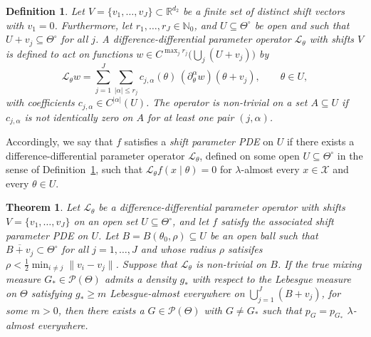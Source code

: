 \documentclass[11pt,twoside]{article} %
\newtheorem{theorem}{Theorem}
\newtheorem{definition}{Definition}
\begin{document}
\begin{definition}\label{def:shift_operator}
Let $V=\{v_1,\ldots,v_J\}\subset\mathbb R^{d_2}$ be a finite set of distinct shift vectors with $v_1=0$. Furthermore, let $r_1,\ldots,r_J\in\mathbb N_0$, and $U\subseteq\Theta^\circ$ be open and such that $U+v_j\subseteq\Theta^\circ$ for all $j$. A \emph{difference-differential parameter operator} $\mathcal L_\theta$ with shifts $V$ is defined to act on functions $ w\in C^{\max_{j}r_j}\big( \bigcup_j(U+v_j)\big)$ by
%
\begin{equation*}
    \mathcal L_\theta w=\sum_{j=1}^J\sum_{|\alpha|\le r_j}c_{j,\alpha}(\theta)\,(\partial^\alpha_\theta w)(\theta+v_j), \qquad \theta \in U,
\end{equation*}
%
with coefficients $c_{j,\alpha}\in C^{|\alpha|}(U)$. The operator is \emph{non-trivial} on a set $A\subseteq U$ if $c_{j,\alpha}$ is not identically zero on $A$ for at least one pair $(j,\alpha)$.
\end{definition}

Accordingly, we say that $f$ satisfies a \emph{shift parameter PDE} on $U$ if  there exists a difference-differential parameter operator $\mathcal L_\theta$, defined on some open $U\subseteq \Theta^\circ$ in the sense of Definition~\ref{def:shift_operator}, such that $\mathcal L_\theta f(x\mid\theta)=0$ for $\lambda$-almost every $x\in\mathcal X$ and every $\theta\in U$.

\begin{theorem}\label{thm:shift}
Let $\mathcal L_\theta$ be a difference-differential parameter operator with shifts $V=\{v_1,\ldots,v_J\}$ on an open set $U\subseteq\Theta^\circ$, and let $f$ satisfy the associated shift parameter PDE on $U$. Let $B=B(\theta_0,\rho)\subseteq U$ be an open ball such that $\overline{B+v_j}\subset\Theta^\circ$ for all $j =1 ,\ldots, J$ and whose radius $\rho$ satisifes $\rho< \frac{1}{2} \min_{i\ne j}\|v_i-v_j\|$.
%
%
Suppose that $\mathcal L_\theta$ is non-trivial on $B$. If the true mixing measure $G_*\in\mathcal P(\Theta)$ admits a density $g_*$ with respect to the Lebesgue measure on $\Theta$ satisfying $g_*\ge m$ Lebesgue-almost everywhere on $\bigcup_{j=1}^J(B+v_j)$, for some $m>0$, then there exists a $G\in\mathcal P(\Theta)$ with $G\ne G_*$ such that $p_G=p_{G_*}$ $\lambda$-almost everywhere.
\end{theorem}
\end{document}
